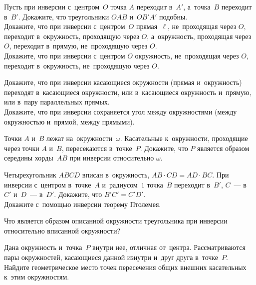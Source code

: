 


\begin{problems}

\item
\subproblem
Пусть при инверсии с~центром~$O$ точка $A$ переходит в~$A'$, а~точка~$B$
переходит в~$B'$.
Докажите, что треугольники $OAB$ и~$OB'A'$ подобны.
\\
\subproblem
Докажите, что при инверсии с~центром~$O$ прямая~$\ell$, не~проходящая
через $O$, переходит в~окружность, проходящую через $O$, а~окружность,
проходящая через $O$, переходит в~прямую, не~проходящую через $O$.
\\
\subproblem
Докажите, что при инверсии с~центром $O$ окружность, не~проходящая через $O$,
переходит в~окружность, не~проходящую через $O$.

\item
\subproblem
Докажите, что при инверсии касающиеся окружности (прямая и~окружность)
переходят в~касающиеся окружности, или в~касающиеся окружность и~прямую,
или в~пару параллельных прямых.
\\
\subproblem
Докажите, что при инверсии сохраняется угол между окружностями
(между окружностью и~прямой, между прямыми).

\item
Точки $A$ и~$B$ лежат на~окружности~$\omega$.
Касательные к~окружности, проходящие через точки $A$ и~$B$, пересекаются
в~точке~$P$.
Докажите, что $P$ является образом середины хорды~$AB$ при инверсии
относительно $\omega$.

\item
\subproblem
Четырехугольник $ABCD$ вписан в~окружность, $AB \cdot CD = AD \cdot BC$.
При инверсии с~центром в~точке~$A$ и~радиусом~$1$
точка~$B$ переходит в~$B'$,
$C$~--- в~$C'$
и~$D$~--- в~$D'$.
Докажите, что $B'C' = C'D'$.
\\
\subproblem
Докажите с~помощью инверсии теорему Птолемея.

\item
Что является образом описанной окружности треугольника при инверсии
относительно вписанной окружности?

\item
Дана окружность и~точка~$P$ внутри нее, отличная от~центра.
Рассматриваются пары окружностей, касающиеся данной изнутри и~друг друга
в~точке~$P$.
Найдите геометрическое место точек пересечения общих внешних касательных к~этим
окружностям.


\end{problems}
